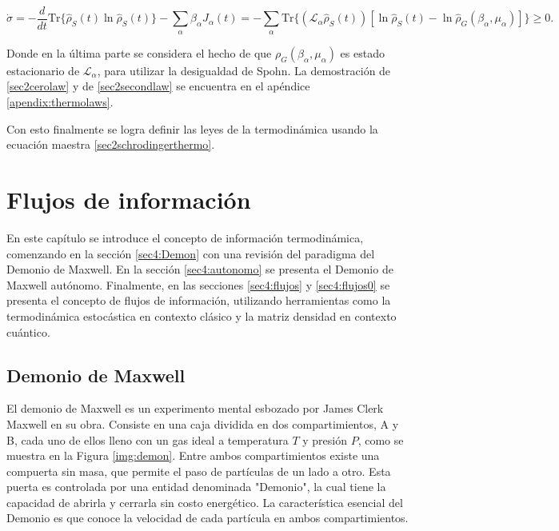 \begin{equation}
    \dot{\sigma} = - \frac{d}{dt}\text{Tr}\{\hat{\rho}_{S}(t) \ln \hat{\rho}_{S}(t) \} - \sum_{\alpha} \beta_{\alpha} J_{\alpha}(t) = -\sum_{\alpha} \text{Tr}\{(\mathcal{L}_{\alpha}\hat{\rho}_{S}(t))[\ln \hat{\rho}_{S}(t) - \ln \hat{\rho}_{G}(\beta_{\alpha},\mu_{\alpha})] \} \geq 0.
\label{sec2secondlaw}
\end{equation}

Donde en la última parte se considera el hecho de que $\rho_{G}(\beta_{\alpha},\mu_{\alpha})$ es estado estacionario de $\mathcal{L}_{\alpha}$, para utilizar la desigualdad de Spohn\cite{spohn2007irreversible}. La demostración de \ref{sec2cerolaw} y de \ref{sec2secondlaw} se encuentra en el apéndice \ref{apendix:thermolaws}. 

Con esto finalmente se logra definir las leyes de la termodinámica usando la ecuación maestra \ref{sec2schrodingerthermo}.


\chapter{Flujos de información}
En este capítulo se introduce el concepto de información termodinámica, comenzando en la sección \ref{sec4:Demon} con una revisión del paradigma del Demonio de Maxwell. En la sección \ref{sec4:autonomo} se presenta el Demonio de Maxwell autónomo. Finalmente, en las secciones \ref{sec4:flujos} y \ref{sec4:flujos0} se presenta el concepto de flujos de información, utilizando herramientas como la termodinámica estocástica en contexto clásico y la matriz densidad en contexto cuántico.


\section{Demonio de Maxwell}
El demonio de Maxwell es un experimento mental esbozado por James Clerk Maxwell en su obra\cite{Maxwell_1871}. Consiste en una caja dividida en dos compartimientos, A y B, cada uno de ellos lleno con un gas ideal a temperatura $T$ y presión $P$, como se muestra en la Figura \ref{img:demon}. Entre ambos compartimientos existe una compuerta sin masa, que permite el paso de partículas de un lado a otro. Esta puerta es controlada por una entidad denominada "Demonio", la cual tiene la capacidad de abrirla y cerrarla sin costo energético. La característica esencial del Demonio es que conoce la velocidad de cada partícula en ambos compartimientos. 

